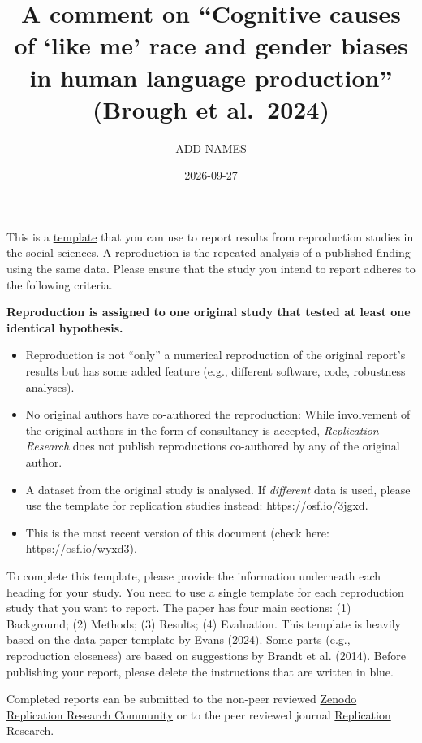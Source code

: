 \documentclass[
  letterpaper,
  DIV=11,
  numbers=noendperiod]{scrartcl}
\title{A comment on ``Cognitive causes of `like me' race and gender
biases in human language production'' (Brough et al.~2024)}
\author{ADD NAMES}
\date{2026-09-27}
\begin{document}
\maketitle


This is a \href{https://osf.io/brxtd/files/wyxd3}{template} that you can
use to report results from reproduction studies in the social sciences.
A reproduction is the repeated analysis of a published finding using the
same data. Please ensure that the study you intend to report adheres to
the following criteria.

\textbf{Reproduction is assigned to one original study that tested at
least one identical hypothesis.}

\begin{itemize}
\item[$\square$]
  Reproduction is not ``only'' a numerical reproduction of the original
  report's results but has some added feature (e.g., different software,
  code, robustness analyses).
\item[$\square$]
  No original authors have co-authored the reproduction: While
  involvement of the original authors in the form of consultancy is
  accepted, \emph{Replication Research} does not publish reproductions
  co-authored by any of the original author.
\item[$\square$]
  A dataset from the original study is analysed. If \emph{different}
  data is used, please use the template for replication studies instead:
  \url{https://osf.io/3jgxd}.
\item[$\square$]
  This is the most recent version of this document (check here:
  \url{https://osf.io/wyxd3}).
\end{itemize}

To complete this template, please provide the information underneath
each heading for your study. You need to use a single template for each
reproduction study that you want to report. The paper has four main
sections: (1) Background; (2) Methods; (3) Results; (4) Evaluation. This
template is heavily based on the data paper template by Evans (2024).
Some parts (e.g., reproduction closeness) are based on suggestions by
Brandt et al. (2014). Before publishing your report, please delete the
instructions that are written in blue.

Completed reports can be submitted to the non-peer reviewed
\href{https://zenodo.org/communities/r2/}{Zenodo Replication Research
Community} or to the peer reviewed journal
\href{https://replicationresearch.org}{Replication Research}.
\end{document}
